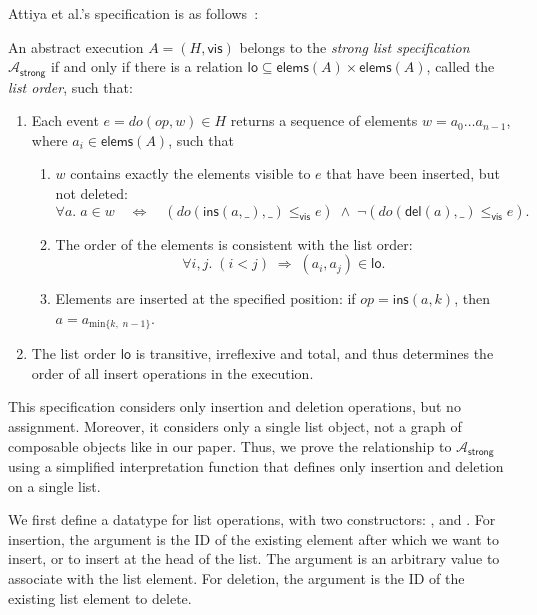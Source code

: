Attiya et al.'s specification is as follows~\cite{Attiya:2016kh}:

\begin{displayquote}
An abstract execution $A = (H, \textsf{vis})$ belongs to the \emph{strong list specification} $\mathcal{A}_\textsf{strong}$ if and only if there is a relation $\textsf{lo} \subseteq \textsf{elems}(A) \times \textsf{elems}(A)$, called the \emph{list order}, such that:
\begin{enumerate}
\item Each event $e = \mathit{do}(\mathit{op}, w) \in H$ returns a sequence of elements $w=a_0 \dots a_{n-1}$, where $a_i \in \textsf{elems}(A)$, such that
\begin{enumerate}
\item $w$ contains exactly the elements visible to $e$ that have been inserted, but not deleted:
\[ \forall a.\; a \in w \quad\Longleftrightarrow\quad (\mathit{do}(\textsf{ins}(a, \_), \_) \le_\textsf{vis} e)
\;\wedge\; \neg(\mathit{do}(\textsf{del}(a), \_) \le_\textsf{vis} e). \]
\item The order of the elements is consistent with the list order:
\[ \forall i, j.\; (i < j) \;\Longrightarrow\; (a_i, a_j) \in \textsf{lo}. \]
\item Elements are inserted at the specified position:
if $\mathit{op} = \textsf{ins}(a, k)$, then $a = a_{\mathrm{min} \{k,\; n-1\}}$.
\end{enumerate}
\item The list order $\textsf{lo}$ is transitive, irreflexive and total, and thus determines the order of all insert operations in the execution.
\end{enumerate}
\end{displayquote}

This specification considers only insertion and deletion operations, but no assignment.
Moreover, it considers only a single list object, not a graph of composable objects like in our paper.
Thus, we prove the relationship to $\mathcal{A}_\textsf{strong}$ using a simplified interpretation function that defines only insertion and deletion on a single list.

We first define a datatype for list operations, with two constructors: , and .
For insertion, the  argument is the ID of the existing element after which we want to insert, or  to insert at the head of the list.
The  argument is an arbitrary value to associate with the list element.
For deletion, the  argument is the ID of the existing list element to delete.

